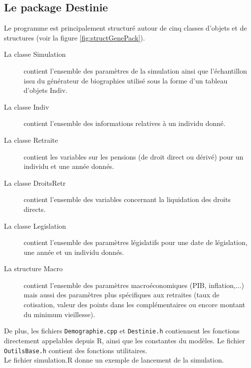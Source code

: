 \subsection{Le package Destinie}


Le programme est principalement structuré autour de cinq classes d'objets et de structures (voir la figure \ref{fig:structGenePack}).\\
\begin{description}
\item[La classe Simulation] contient l'ensemble des paramètres de la simulation ainsi que 
l'échantillon issu du générateur de biographies
utilisé sous la forme d'un tableau d'objets Indiv.
\item[La classe Indiv] contient l'ensemble des informations relatives à un individu donné.
\item[La classe Retraite] contient les variables sur les pensions (de droit direct ou dérivé) 
pour un individu et une année donnés.
\item[La classe DroitsRetr] contient l'ensemble des variables concernant la liquidation des
droits directs.
\item[La classe Legislation] contient l'ensemble des paramètres législatifs pour une date de législation, une année et un individu donnés. 
\item[La structure Macro] contient l'ensemble des paramètres macroéconomiques (PIB, inflation,...) mais aussi des 
paramètres plus spécifiques aux retraites (taux de cotisation, valeur des points dans les complémentaires ou encore montant du minimum vieillesse).
\end{description}

De plus, les fichiers {\tt Demographie.cpp}  et {\tt Destinie.h} contiennent les fonctions directement appelables depuis R,
ainsi que les constantes du modèles.
Le fichier {\tt OutilsBase.h} contient des fonctions utilitaires.\\

Le fichier simulation.R donne un exemple de lancement de la simulation.



\phantom{sdfgsdgf
sdfgsdg}

\medskip 

